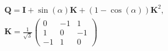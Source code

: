 $$
\begin{gathered}
\mathbf Q = \mathbf I + \sin{\left(\alpha \right)} \mathbf K + \left(1 - \cos{\left(\alpha \right)}\right) \mathbf K^{2},\\
\mathbf K = \frac{1}{\sqrt3}\left(\begin{matrix}0 & -1 & 1\\1 & 0 & -1\\-1 & 1 & 0\end{matrix}\right)
\end{gathered}
$$
